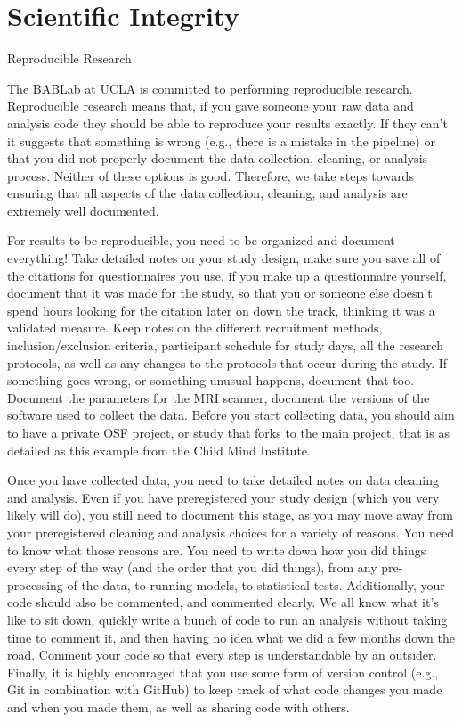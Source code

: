 \documentclass[]{book}
\begin{document}
\hypertarget{scientific-integrity}{%
\section{Scientific Integrity}\label{scientific-integrity}}

Reproducible Research

The BABLab at UCLA is committed to performing reproducible research. Reproducible research means that, if you gave someone your raw data and analysis code they should be able to reproduce your results exactly. If they can't it suggests that something is wrong (e.g., there is a mistake in the pipeline) or that you did not properly document the data collection, cleaning, or analysis process. Neither of these options is good. Therefore, we take steps towards ensuring that all aspects of the data collection, cleaning, and analysis are extremely well documented.

For results to be reproducible, you need to be organized and document everything! Take detailed notes on your study design, make sure you save all of the citations for questionnaires you use, if you make up a questionnaire yourself, document that it was made for the study, so that you or someone else doesn't spend hours looking for the citation later on down the track, thinking it was a validated measure. Keep notes on the different recruitment methods, inclusion/exclusion criteria, participant schedule for study days, all the research protocols, as well as any changes to the protocols that occur during the study. If something goes wrong, or something unusual happens, document that too. Document the parameters for the MRI scanner, document the versions of the software used to collect the data. Before you start collecting data, you should aim to have a private OSF project, or study that forks to the main project, that is as detailed as this example from the Child Mind Institute.

Once you have collected data, you need to take detailed notes on data cleaning and analysis. Even if you have preregistered your study design (which you very likely will do), you still need to document this stage, as you may move away from your preregistered cleaning and analysis choices for a variety of reasons. You need to know what those reasons are. You need to write down how you did things every step of the way (and the order that you did things), from any pre-processing of the data, to running models, to statistical tests. Additionally, your code should also be commented, and commented clearly. We all know what it's like to sit down, quickly write a bunch of code to run an analysis without taking time to comment it, and then having no idea what we did a few months down the road. Comment your code so that every step is understandable by an outsider. Finally, it is highly encouraged that you use some form of version control (e.g., Git in combination with GitHub) to keep track of what code changes you made and when you made them, as well as sharing code with others.
\end{document}
